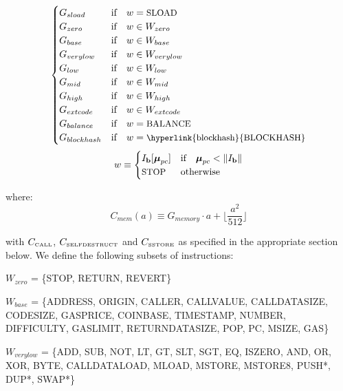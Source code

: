 \documentclass[9pt,oneside]{amsart}
\begin{document}
\begin{equation}
\begin{cases}
G_{sload} & \text{if} \quad w = \text{\small SLOAD}\\
G_{zero} & \text{if} \quad w \in W_{zero}\\
G_{base} & \text{if} \quad w \in W_{base}\\
G_{verylow} & \text{if} \quad w \in W_{verylow}\\
G_{low} & \text{if} \quad w \in W_{low}\\
G_{mid} & \text{if} \quad w \in W_{mid}\\
G_{high} & \text{if} \quad w \in W_{high}\\
G_{extcode} & \text{if} \quad w \in W_{extcode}\\
G_{balance} & \text{if} \quad w = \text{\small BALANCE}\\
G_{blockhash} & \text{if} \quad w = \text{\small \hyperlink{blockhash}{BLOCKHASH}}\\
\end{cases}
\end{equation}
\begin{equation}
w \equiv \begin{cases} I_{\mathbf{b}}[\boldsymbol{\mu}_{pc}] & \text{if} \quad \boldsymbol{\mu}_{pc} < \lVert I_{\mathbf{b}} \rVert\\
\text{\small STOP} & \text{otherwise}
\end{cases}
\end{equation}

where:
\begin{equation}
C_{mem}(a) \equiv G_{memory} \cdot a + \Big\lfloor \dfrac{a^2}{512} \Big\rfloor
\end{equation}

with $C_\text{\tiny CALL}$, $C_\text{\tiny SELFDESTRUCT}$ and $C_\text{\tiny SSTORE}$ as specified in the appropriate section below. We define the following subsets of instructions:

$W_{zero}$ = \{{\small STOP}, {\small RETURN}, {\small REVERT}\}

$W_{base}$ = \{{\small ADDRESS}, {\small ORIGIN}, {\small CALLER}, {\small CALLVALUE}, {\small CALLDATASIZE}, {\small CODESIZE}, {\small GASPRICE}, {\small COINBASE},\newline \noindent\hspace*{1cm} {\small TIMESTAMP}, {\small NUMBER}, {\small DIFFICULTY}, {\small GASLIMIT}, {\small RETURNDATASIZE}, {\small POP}, {\small PC}, {\small MSIZE}, {\small GAS}\}

$W_{verylow}$ = \{{\small ADD}, {\small SUB}, {\small NOT}, {\small LT}, {\small GT}, {\small SLT}, {\small SGT}, {\small EQ}, {\small ISZERO}, {\small AND}, {\small OR}, {\small XOR}, {\small BYTE}, {\small CALLDATALOAD}, \newline \noindent\hspace*{1cm} {\small MLOAD}, {\small MSTORE}, {\small MSTORE8}, {\small PUSH*}, {\small DUP*}, {\small SWAP*}\}
\end{document}
